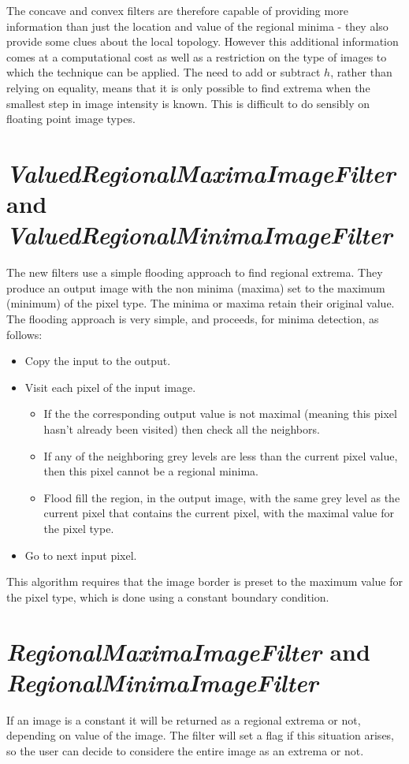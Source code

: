 \documentclass{InsightArticle}
\begin{document}
The concave and convex filters are therefore capable of providing more
information than just the location and value of the regional minima -
they also provide some clues about the local topology. However this
additional information comes at a computational cost as well as a
restriction on the type of images to which the technique can be
applied. The need to add or subtract $h$, rather than relying on
equality, means that it is only possible to find extrema when the
smallest step in image intensity is known. This is difficult to do
sensibly on floating point image types.

\section{{\em ValuedRegionalMaximaImageFilter} and {\em ValuedRegionalMinimaImageFilter}}
The new filters use a simple flooding approach to find regional
extrema. They produce an output image with the non minima (maxima) set
to the maximum (minimum) of the pixel type. The minima or maxima
retain their original value. 
The flooding approach is very simple, and proceeds, for minima detection, as follows:
\begin{itemize}
\item Copy the input to the output.
\item Visit each pixel of the input image. 
   \begin{itemize}	
   \item If the the corresponding output 
	 value is not maximal (meaning this pixel hasn't already been
      visited) then check all the neighbors. 
    \item If any of the neighboring grey levels are less than the current pixel 
      value, then this pixel cannot be a regional minima.
    \item Flood fill the region, in the output image, with the same grey level 
      as the current pixel that contains the current pixel, with the
      maximal value for the pixel type.
    \end{itemize}
\item Go to next input pixel.
\end{itemize}

This algorithm requires that the image border is preset to the maximum
value for the pixel type, which is done using a constant boundary
condition.

\section{{\em RegionalMaximaImageFilter} and {\em RegionalMinimaImageFilter}}
If an image is a constant it will be returned as a regional extrema or not,
depending on value of the image. The filter will set a flag if
this situation arises, so the user can decide to considere the entire image as an
extrema or not.
\end{document}
